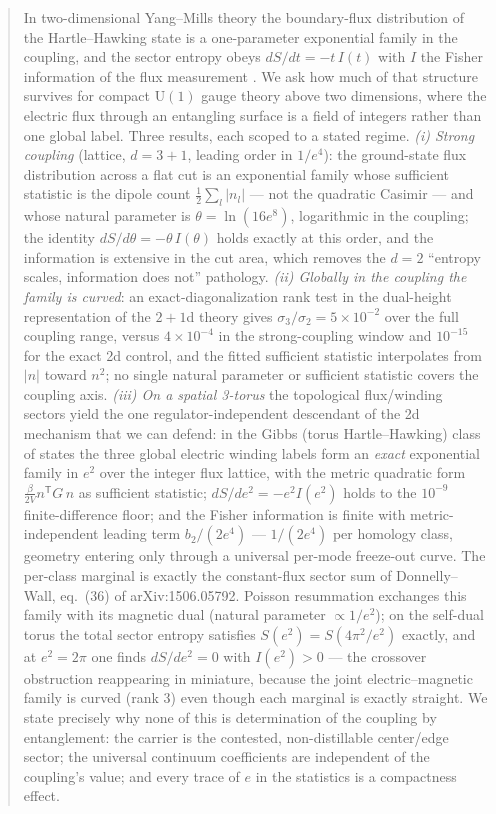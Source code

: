 \documentclass[11pt]{article}
\theoremstyle{remark}
\theoremstyle{plain}
\begin{document}
\begin{abstract}
In two-dimensional Yang--Mills theory the boundary-flux distribution of the Hartle--Hawking state is a one-parameter exponential family in the coupling, and the sector entropy obeys $dS/dt = -t\,I(t)$ with $I$ the Fisher information of the flux measurement \cite{P3}. We ask how much of that structure survives for compact $\mathrm{U}(1)$ gauge theory above two dimensions, where the electric flux through an entangling surface is a field of integers rather than one global label. Three results, each scoped to a stated regime. \emph{(i) Strong coupling} (lattice, $d=3{+}1$, leading order in $1/e^4$): the ground-state flux distribution across a flat cut is an exponential family whose sufficient statistic is the dipole count $\tfrac12\sum_l |n_l|$ --- not the quadratic Casimir --- and whose natural parameter is $\theta = \ln(16e^8)$, logarithmic in the coupling; the identity $dS/d\theta = -\theta\,I(\theta)$ holds exactly at this order, and the information is extensive in the cut area, which removes the $d=2$ ``entropy scales, information does not'' pathology. \emph{(ii) Globally in the coupling the family is curved}: an exact-diagonalization rank test in the dual-height representation of the $2{+}1$d theory gives $\sigma_3/\sigma_2 = 5\times10^{-2}$ over the full coupling range, versus $4\times10^{-4}$ in the strong-coupling window and $10^{-15}$ for the exact 2d control, and the fitted sufficient statistic interpolates from $|n|$ toward $n^2$; no single natural parameter or sufficient statistic covers the coupling axis. \emph{(iii) On a spatial 3-torus} the topological flux/winding sectors yield the one regulator-independent descendant of the 2d mechanism that we can defend: in the Gibbs (torus Hartle--Hawking) class of states the three global electric winding labels form an \emph{exact} exponential family in $e^2$ over the integer flux lattice, with the metric quadratic form $\tfrac{\beta}{2V} n^{\mathsf T} G\, n$ as sufficient statistic; $dS/de^2 = -e^2 I(e^2)$ holds to the $10^{-9}$ finite-difference floor; and the Fisher information is finite with metric-independent leading term $b_2/(2e^4)$ --- $1/(2e^4)$ per homology class, geometry entering only through a universal per-mode freeze-out curve. The per-class marginal is exactly the constant-flux sector sum of Donnelly--Wall, eq.~(36) of arXiv:1506.05792. Poisson resummation exchanges this family with its magnetic dual (natural parameter $\propto 1/e^2$); on the self-dual torus the total sector entropy satisfies $S(e^2) = S(4\pi^2/e^2)$ exactly, and at $e^2 = 2\pi$ one finds $dS/de^2 = 0$ with $I(e^2) > 0$ --- the crossover obstruction reappearing in miniature, because the joint electric--magnetic family is curved (rank 3) even though each marginal is exactly straight. We state precisely why none of this is determination of the coupling by entanglement: the carrier is the contested, non-distillable center/edge sector; the universal continuum coefficients are independent of the coupling's value; and every trace of $e$ in the statistics is a compactness effect.
\end{abstract}
\end{document}
